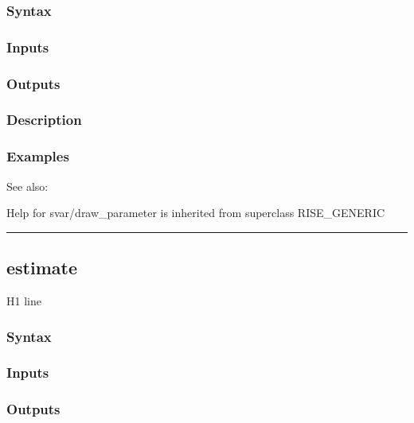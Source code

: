 \documentclass[letterpaper,10pt,english]{sphinxmanual}
\begin{document}
\subsubsection{Syntax}
\label{classes/models/@svar/svar:id3}

\subsubsection{Inputs}
\label{classes/models/@svar/svar:id4}

\subsubsection{Outputs}
\label{classes/models/@svar/svar:id5}

\subsubsection{Description}
\label{classes/models/@svar/svar:id6}

\subsubsection{Examples}
\label{classes/models/@svar/svar:id7}
See also:

Help for svar/draw\_parameter is inherited from superclass RISE\_GENERIC


\bigskip\hrule{}\bigskip



\subsection{estimate}
\label{classes/models/@svar/svar:estimate}\label{classes/models/@svar/svar:id8}
H1 line


\subsubsection{Syntax}
\label{classes/models/@svar/svar:id9}

\subsubsection{Inputs}
\label{classes/models/@svar/svar:id10}

\subsubsection{Outputs}
\label{classes/models/@svar/svar:id11}
\end{document}

